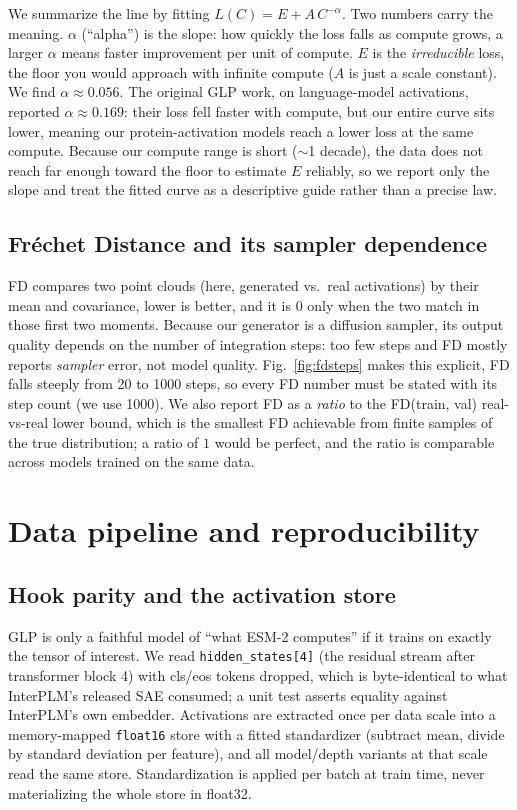 \documentclass{article}
\begin{document}
We summarize the line by fitting $L(C) = E + A\,C^{-\alpha}$. Two numbers carry the
meaning. $\alpha$ (``alpha'') is the slope: how quickly the loss falls as compute grows, 
a larger $\alpha$ means faster improvement per unit of compute. $E$ is the
\emph{irreducible} loss, the floor you would approach with infinite compute ($A$ is just a
scale constant). We find $\alpha \approx 0.056$. The original GLP work, on
language-model activations, reported $\alpha \approx 0.169$: their loss fell faster with
compute, but our entire curve sits lower, meaning our protein-activation models reach a
lower loss at the same compute. Because our compute range is short ($\sim$1 decade), the
data does not reach far enough toward the floor to estimate $E$ reliably, so we report only
the slope and treat the fitted curve as a descriptive guide rather than a precise law.

\subsection{Fréchet Distance and its sampler dependence}
\label{app:fd}

FD compares two point clouds (here, generated vs.\ real activations) by their mean and
covariance, lower is better, and it is $0$ only when the two match in those first two
moments. Because our generator is a diffusion sampler, its output quality depends on the
number of integration steps: too few steps and FD mostly reports \emph{sampler} error, not
model quality. Fig.~\ref{fig:fdsteps} makes this explicit, FD falls steeply from 20 to
1000 steps, so every FD number must be stated with its step count (we use 1000). We also
report FD as a \emph{ratio} to the FD(train, val) real-vs-real lower bound, which is the
smallest FD achievable from finite samples of the true distribution; a ratio of $1$ would
be perfect, and the ratio is comparable across models trained on the same data.

\section{Data pipeline and reproducibility}
\label{app:data}

\subsection{Hook parity and the activation store}
\label{app:pipeline}

GLP is only a faithful model of ``what ESM-2 computes'' if it trains on exactly the tensor
of interest. We read \texttt{hidden\_states[4]} (the residual stream after transformer
block 4) with cls/eos tokens dropped, which is byte-identical to what InterPLM's released
SAE consumed; a unit test asserts equality against InterPLM's own embedder. Activations
are extracted once per data scale into a memory-mapped \texttt{float16} store with a fitted
standardizer (subtract mean, divide by standard deviation per feature), and all model/depth
variants at that scale read the same store. Standardization is applied per batch at train
time, never materializing the whole store in float32.
\end{document}
